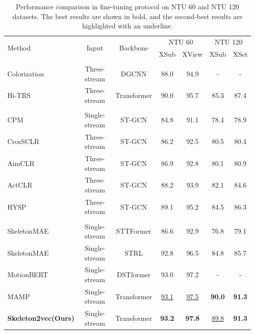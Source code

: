 \begin{table}[tb] \scriptsize
    \caption{
      Performance comparison in fine-tuning protocol on NTU 60 and NTU 120 datasets.
      The best results are shown in bold, and the second-best results
      are highlighted with an underline.
    }
    \centering
    \setlength{\tabcolsep}{4pt} %
    \begin{tabular}{l c c c c c c}
      \toprule
      \multirow{2}{*}{Method} &
      \multirow{2}{*}{Input} &
      \multirow{2}{*}{Backbone} &
      \multicolumn{2}{c}{NTU 60} &
      \multicolumn{2}{c}{NTU 120} \\
      & & & XSub & XView & XSub & XSet \\
      \midrule
      \rowcolor{Gray!20} \multicolumn{7}{l}{\textit{Other pretext tasks:}} \\
      Colorization \cite{yang2021skeleton} & Three-stream & DGCNN & 88.0 & 94.9 & - & - \\
      Hi-TRS \cite{chen2022hierarchically} & Three-stream & Transformer & 90.0 & 95.7 & 85.3 & 87.4 \\
      \rowcolor{Gray!20} \multicolumn{7}{l}{\textit{Contrastive Learning:}} \\
      CPM \cite{zhang2022contrastive} & Single-stream & ST-GCN & 84.8 & 91.1 & 78.4 & 78.9 \\
      CrosSCLR \cite{li20213d} & Three-stream & ST-GCN & 86.2 & 92.5 & 80.5 & 80.4 \\
      AimCLR \cite{guo2022contrastive} & Three-stream & ST-GCN & 86.9 & 92.8 & 80.1 & 80.9 \\
      ActCLR \cite{lin2023actionlet} & Three-stream & ST-GCN & 88.2 & 93.9 & 82.1 & 84.6 \\
      HYSP \cite{franco2023hyperbolic} & Three-stream & ST-GCN & 89.1 & 95.2 & 84.5 & 86.3 \\
      \rowcolor{Gray!20} \multicolumn{7}{l}{\textit{Masked Prediction:}} \\
      SkeletonMAE \cite{wu2023skeletonmae} & Single-stream & STTFormer & 86.6 & 92.9 & 76.8 & 79.1 \\
      SkeletonMAE \cite{yan2023skeletonmae} & Single-stream & STRL & 92.8 & 96.5 & 84.8 & 85.7 \\
      MotionBERT \cite{zhu2023motionbert} & Single-stream & DSTformer & 93.0 & 97.2 & - & - \\
      MAMP \cite{mao2023masked} & Single-stream & Transformer & \underline{93.1} & \underline{97.5} & \textbf{90.0} & \textbf{91.3} \\
      \midrule
      \textbf{Skeleton2vec(Ours)} & Single-stream & Transformer & \textbf{93.2} & \textbf{97.8} & \underline{89.8} & \textbf{91.3} \\
      \bottomrule
    \end{tabular}
    \label{tab:fine-tuning}
    \vspace{-15pt}
\end{table}

